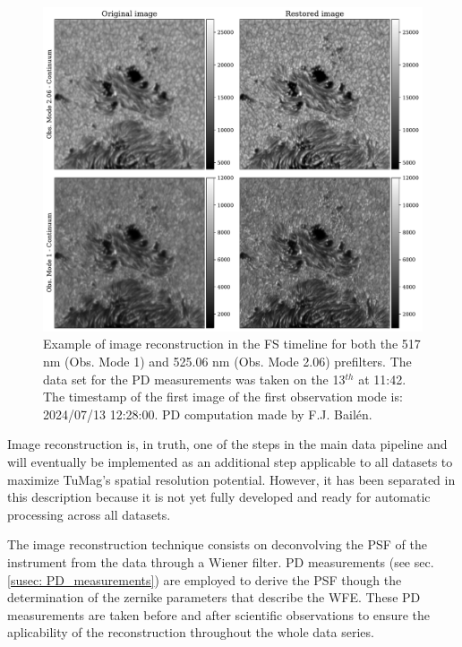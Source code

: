 \begin{figure}[h]
  \begin{minipage}[c]{0.67\textwidth}
    \includegraphics[width=\textwidth]{figures/Pipeline/Image_restoration.pdf}
  \end{minipage}\hfill
  \begin{minipage}[c]{0.29\textwidth}
    \caption[Image reconstruction.]{
     Example of image reconstruction in the FS timeline for both the 517 nm (Obs. Mode 1) and 525.06 nm (Obs. Mode 2.06) prefilters. The data set for the PD measurements was taken on the 13$^{th}$ at 11:42. The timestamp of the first image of the first observation mode is: 2024/07/13 12:28:00. PD computation made by F.J. Bailén.
     \label{fig_pipeline:  image_restoration}} 
  \end{minipage}
\end{figure}

Image reconstruction is, in truth, one of the steps in the main data pipeline and will eventually be implemented as an additional step applicable to all datasets to maximize TuMag's spatial resolution potential. However, it has been separated in this description because it is not yet fully developed and ready for automatic processing across all datasets.

The image reconstruction technique consists on deconvolving the PSF of the instrument from the data through a Wiener filter. PD measurements (see sec. \ref{susec: PD_measurements}) are employed to derive the PSF though the determination of the zernike parameters that describe the WFE. These PD measurements are taken before and after scientific observations to ensure the aplicability of the reconstruction throughout the whole data series.

